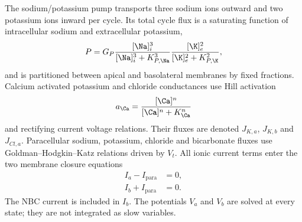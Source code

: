 The sodium/potassium pump transports three sodium ions outward and two potassium ions inward per cycle. Its total cycle flux is a saturating function of intracellular sodium and extracellular potassium,
\begin{equation}
\label{eq:pump}
P=G_P
\frac{[\Na]_i^3}{[\Na]_i^3+K_{P,\Na}^3}
\frac{[\K]_e^2}{[\K]_e^2+K_{P,\K}^2},
\end{equation}
and is partitioned between apical and basolateral membranes by fixed fractions. Calcium activated potassium and chloride conductances use Hill activation
\[
a_{\Ca}=\frac{[\Ca]^n}{[\Ca]^n+K_{\Ca}^n}
\]
and rectifying current voltage relations. Their fluxes are denoted $J_{K,a}$, $J_{K,b}$ and $J_{Cl,a}$. Paracellular sodium, potassium, chloride and bicarbonate fluxes use Goldman--Hodgkin--Katz relations driven by $V_t$. All ionic current terms enter the two membrane closure equations
\begin{align}
I_a-I_{\mathrm{para}}&=0,
\label{eq:current-apical}\\
I_b+I_{\mathrm{para}}&=0.
\label{eq:current-basal}
\end{align}
The NBC current is included in $I_b$. The potentials $V_a$ and $V_b$ are solved at every state; they are not integrated as slow variables.
